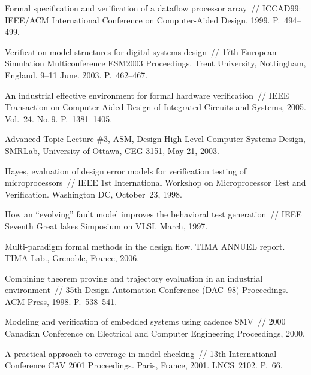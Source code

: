 \begin{multicols}{2}
{{\begin{thebibliography}{99}
Formal specification and verification of a dataflow processor array~// ICCAD99: IEEE/ACM International
Conference on Computer-Aided Design, 1999. P.~494--499.

Verification model structures for digital systems design~//
17th  European  Simulation Multiconference
ESM2003 Proceedings.   Trent University, Nottingham, England.
9--11 June. 2003. P.~462--467.

An industrial effective environment for formal hardware verification~//
IEEE Transaction
on Computer-Aided Design of Integrated Circuits and Systems, 2005. Vol.~24.  No.\,9.
P.~1381--1405.

Advanced Topic Lecture \#3, ASM, Design High Level Computer Systems Design,
SMRLab, University of Ottawa, CEG 3151, May 21, 2003.

Hayes, evaluation of design error models for verification testing of
micro\-processors~//  IEEE 1st International Workshop on Micro\-processor Test and
Verification. Washington DC, October~23, 1998.

How an ``evolving'' fault model improves the
behavioral test generation~//
IEEE Seventh Great lakes Simposium on VLSI. March, 1997.

Multi-paradigm formal methods in the design flow. TIMA ANNUEL report. TIMA
Lab., Grenoble, France, 2006.

Combining theorem proving and trajectory evaluation in an
industrial environment~// 35th Design Automation Conference (DAC~98)
Proceedings. ACM Press, 1998. P.~538--541.

Modeling and veri\-fi\-cation of embedded systems using
cadence SMV~//  2000 Canadian Conference on Electrical and
Computer Engineering Proceedings, 2000.

A practical approach to coverage in model checking~// 13th
International Conference CAV 2001 Proceedings. Paris, France, 2001. LNCS~2102. P.~66.


\end{thebibliography}}}
\end{multicols}
